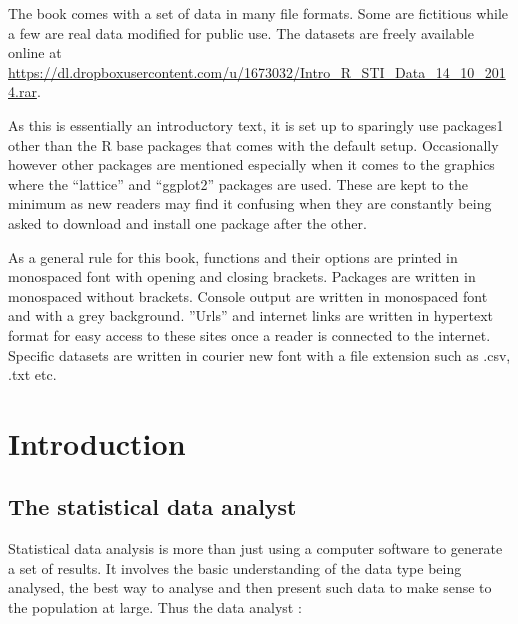 \documentclass[
]{book}
\theoremstyle{definition}
\theoremstyle{definition}
\theoremstyle{definition}
\theoremstyle{definition}
\theoremstyle{remark}
\begin{document}
The book comes with a set of data in many file formats. Some are fictitious
while a few are real data modified for public use. The datasets are freely
available online at
\url{https://dl.dropboxusercontent.com/u/1673032/Intro_R_STI_Data_14_10_2014.rar}.

As this is essentially an introductory text, it is set up to sparingly use
packages1 other than the R base packages that comes with the default setup.
Occasionally however other packages are mentioned especially when it comes to
the graphics where the ``lattice'' and ``ggplot2'' packages are used. These are kept
to the minimum as new readers may find it confusing when they are constantly
being asked to download and install one package after the other.

As a general rule for this book, functions and their options are printed in
monospaced font with opening and closing brackets. Packages are written in
monospaced without brackets. Console output are written in monospaced font and
with a grey background. ''Urls'' and internet links are written in hypertext
format for easy access to these sites once a reader is connected to the internet.
Specific datasets are written in courier new font with a file extension such as
.csv, .txt etc.

\hypertarget{introduction}{%
\chapter{Introduction}\label{introduction}}

\hypertarget{the-statistical-data-analyst}{%
\section{The statistical data analyst}\label{the-statistical-data-analyst}}

Statistical data analysis is more than just using a computer software to
generate a set of results. It involves the basic understanding of the data type being analysed, the best way to analyse and then present such data to make sense to the population at large. Thus the data analyst :
\end{document}
